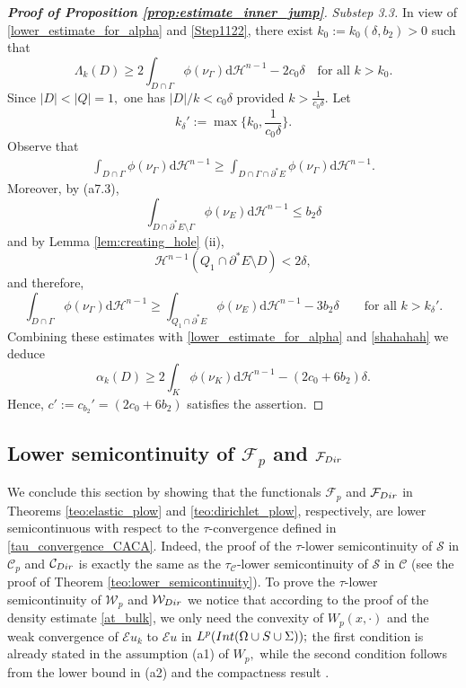 \documentclass[reqno]{amsart}
\numberwithin{equation}{section}
\theoremstyle{plain}
\theoremstyle{definition}
\newcommand{\cH}{\mathcal{H}}
\newcommand{\cS}{\mathcal{S}}
\newcommand{\cF}{\mathcal{F}}
\newcommand{\cW}{\mathcal{W}}
\newcommand{\p}{\partial}
\newcommand{\bound}{b}
\renewcommand{\d}{\mathrm{d}}
\newcommand{\str}[1]{\mathcal{E}#1}
\newcommand{\admissible}{\mathcal{C}}
\newcommand{\substrate}{S}
\newcommand{\Ins}[1]{{\rm Int}{(#1\cup \substrate\cup \Sigma)}}
\begin{document}
\begin{proof}[\textbf{Proof of Proposition \ref{prop:estimate_inner_jump}}]
{\it Substep 3.3.}  In view of  \eqref{lower_estimate_for_alpha} and \eqref{Step1122}, there exist $k_0:=k_0(\delta,\bound_2)>0$ such that
\begin{equation}\label{shahahah}
\Lambda_k(D) \ge 2\int_{D\cap \Gamma} \phi(\nu_{\Gamma}) \d\cH^{n-1} - 2c_0\delta  \quad\text{for all $k>k_0.$}
\end{equation}
%
 Since $|D|<|Q| = 1,$ one has $|D|/k < c_0\delta$ provided $k>\frac{1}{c_0\delta}.$ Let
$$
k_\delta':=\max\Big\{k_0,\frac{1}{c_0\delta}\Big\}.
$$
Observe that
\begin{align*}
\int_{D\cap \Gamma} \phi(\nu_{\Gamma}) \d\cH^{n-1} 
\ge  \int_{D\cap \Gamma\cap \p^*E} \phi(\nu_{\Gamma}) \d\cH^{n-1}.
\end{align*}
Moreover, by (a7.3),
$$
\int_{D\cap \p^*E\setminus \Gamma} \phi(\nu_E)\d\cH^{n-1} \le \bound_2\delta
$$
and by Lemma \ref{lem:creating_hole} (ii),
$$
\cH^{n-1}(Q_1\cap \p^*E \setminus D) < 2\delta,
$$
and therefore,
$$
\int_{D\cap \Gamma} \phi(\nu_{\Gamma}) \d\cH^{n-1} \ge 
\int_{Q_1\cap\p^*E} \phi(\nu_E)\d\cH^{n-1} - 3\bound_2\delta\qquad \text{for all $k>k_\delta'$}.
$$
Combining these estimates with \eqref{lower_estimate_for_alpha} and \eqref{shahahah} we deduce
$$
\alpha_k(D) \ge 2\int_K \phi(\nu_K)\d\cH^{n-1}  - (2c_0+6\bound_2)\delta.
$$
Hence,
$
c':=c_{\bound_2}'=(2c_0+6\bound_2)
$
satisfies the assertion.
\end{proof}



\subsection{Lower semicontinuity of $\cF_p$ and $\cF_{\rm Dir}$}

We conclude this section by showing that the functionals $\cF_p$ and $\cF_{\rm Dir}$ in Theorems \ref{teo:elastic_plow} and \ref{teo:dirichlet_plow}, respectively, are lower semicontinuous with respect to the $\tau$-convergence defined in \eqref{tau_convergence_CACA}. 
%
Indeed, the proof of the $\tau$-lower semicontinuity of $\cS$ in $\admissible_p$ and $\admissible_{\rm Dir}$ is exactly the same as the $\tau_\admissible$-lower semicontinuity of  $\cS$ in $\admissible$ (see the proof of Theorem \ref{teo:lower_semicontinuity}). To prove the $\tau$-lower semicontinuity of $\cW_p$ and $\cW_{\rm Dir}$ we notice that according to the proof of the density estimate \eqref{at_bulk}, we only need the convexity of $W_p(x,\cdot)$ and the weak convergence of $\str{u_k}$ to $\str{u}$ in $L^p(\Ins{\Omega});$ the first condition is already stated in the assumption (a1) of $W_p,$ while the second condition follows from the lower bound in (a2) and the compactness  result \cite[Theorem 1.1]{ChC:2020_jems}.
\end{document}
